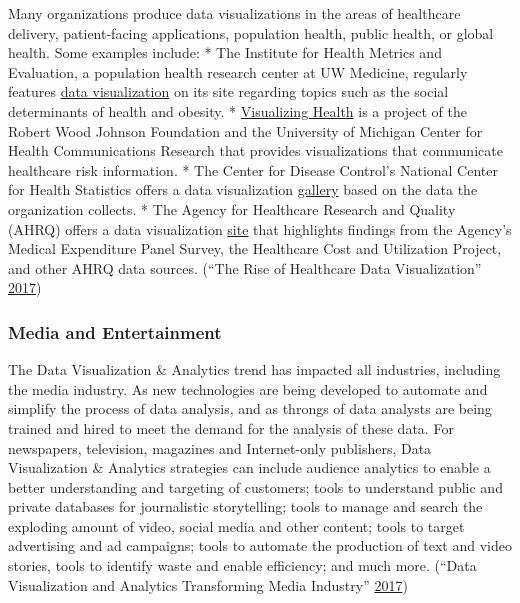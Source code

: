 \documentclass[]{book}
\begin{document}
Many organizations produce data visualizations in the areas of healthcare delivery, patient-facing applications, population health, public health, or global health. Some examples include:
* The Institute for Health Metrics and Evaluation, a population health research center at UW Medicine, regularly features \href{http://www.healthdata.org/results/data-visualizations}{data visualization} on its site regarding topics such as the social determinants of health and obesity.
* \href{http://www.vizhealth.org/gallery/}{Visualizing Health} is a project of the Robert Wood Johnson Foundation and the University of Michigan Center for Health Communications Research that provides visualizations that communicate healthcare risk information.
* The Center for Disease Control's National Center for Health Statistics offers a data visualization \href{https://www.cdc.gov/nchs/data-visualization/index.htm}{gallery} based on the data the organization collects.
* The Agency for Healthcare Research and Quality (AHRQ) offers a data visualization \href{https://www.ahrq.gov/data/infographics/index.html}{site} that highlights findings from the Agency's Medical Expenditure Panel Survey, the Healthcare Cost and Utilization Project, and other AHRQ data sources. (``The Rise of Healthcare Data Visualization'' \protect\hyperlink{ref-rise_of_healthcare}{2017})

\hypertarget{media-and-entertainment}{%
\subsubsection{Media and Entertainment}\label{media-and-entertainment}}

The Data Visualization \& Analytics trend has impacted all industries, including the media industry. As new technologies are being developed to automate and simplify the process of data analysis, and as throngs of data analysts are being trained and hired to meet the demand for the analysis of these data. For newspapers, television, magazines and Internet-only publishers, Data Visualization \& Analytics strategies can include audience analytics to enable a better understanding and targeting of customers; tools to understand public and private databases for journalistic storytelling; tools to manage and search the exploding amount of video, social media and other content; tools to target advertising and ad campaigns; tools to automate the production of text and video stories, tools to identify waste and enable efficiency; and much more. (``Data Visualization and Analytics Transforming Media Industry'' \protect\hyperlink{ref-media_viz}{2017})
\end{document}
